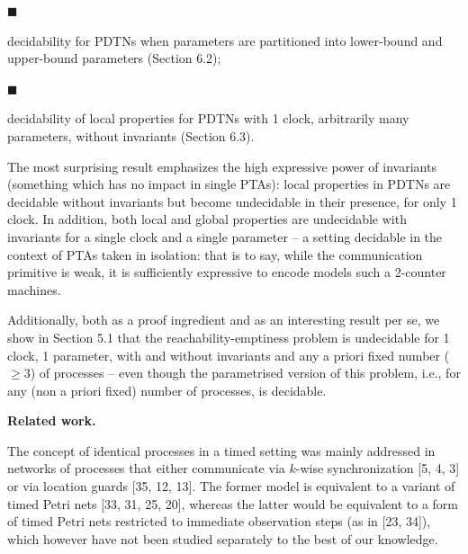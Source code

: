  
\par\noindent  $\blacksquare$ 
 
decidability for PDTNs when parameters are partitioned into lower-bound and upper-bound parameters (Section 6.2);\par
 
 
 
\par\noindent  $\blacksquare$ 
 
decidability of local properties for PDTNs with 1 clock, arbitrarily many parameters, without invariants (Section 6.3).\par
 
 
  
The most surprising result emphasizes the high expressive power of invariants (something which has no impact in single PTAs): local properties in PDTNs are decidable without invariants but become undecidable in their presence, for only 1 clock. In addition, both local and global properties are undecidable with invariants for a single clock and a single parameter -- a setting decidable in the context of PTAs taken in isolation: that is to say, while the communication primitive is weak, it is sufficiently expressive to encode models such a 2-counter machines.\par
 
 
 
Additionally, both as a proof ingredient and as an interesting result per se, we show in Section 5.1 that the reachability-emptiness problem is undecidable for 1 clock, 1 parameter, with and without invariants and any a priori fixed number ($\geq 3$) of processes -- even though the parametrised version of this problem, i.e., for any (non a priori fixed) number of processes, is decidable.\par
 
 
 
 
\par\medskip\noindent\textbf{Related work.}\par
 
 
The concept of identical processes in a timed setting was mainly addressed in networks of processes that either communicate via $k$-wise synchronization [5, 4, 3] or via location guards [35, 12, 13]. The former model is equivalent to a variant of timed Petri nets [33, 31, 25, 20], whereas the latter would be equivalent to a form of timed Petri nets restricted to immediate observation steps (as in [23, 34]), which however have not been studied separately to the best of our knowledge.\par
 
